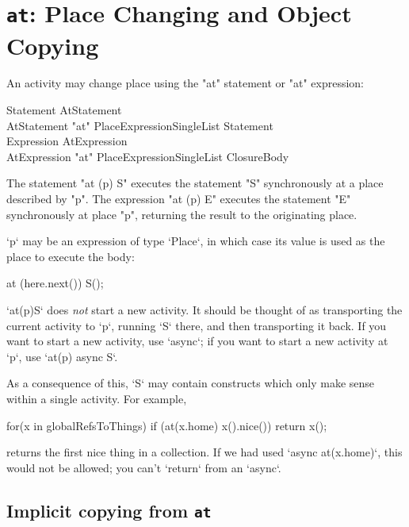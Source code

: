 \section{ {\tt at}: Place Changing and Object Copying}\label{AtStatement}

An activity may change place using the \xcd"at" statement or
\xcd"at" expression:

\begin{grammar}
Statement \: AtStatement \\
AtStatement \: \xcd"at" PlaceExpressionSingleList Statement \\
Expression \: AtExpression \\
AtExpression \: \xcd"at" PlaceExpressionSingleList ClosureBody 
\end{grammar}

The statement \xcd"at (p) S" executes the statement \xcd"S"
synchronously at a place described by \xcd"p".
The expression \xcd"at (p) E" executes the statement \xcd"E"
synchronously at place \xcd"p", returning the result to the
originating place.  




\xcd`p` may be an expression of type \xcd`Place`, in which case its value is
used as the place to execute the body: 
\begin{xten}
   at (here.next()) S();
\end{xten}
\noindent



\xcd`at(p)S` does {\em not} start a new activity.  It should be thought of as
transporting the current activity to \xcd`p`, running \xcd`S` there, and then
transporting it back.    If you want to start a new activity, use \xcd`async`;
if you want to start a new activity at \xcd`p`, use 
\xcd`at(p) async S`.  

As a consequence of this, \xcd`S` may contain constructs which only make sense
within a single activity.  
For example, 
\begin{xten}
    for(x in globalRefsToThings) 
      if (at(x.home) x().nice()) 
        return x();
\end{xten}
returns the first nice thing in a collection.   If we had used 
\xcd`async at(x.home)`, this would not be allowed; 
you can't \xcd`return` from an
\xcd`async`. 

\subsection{Implicit copying from {\tt at} }

